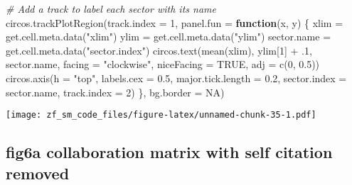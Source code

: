 \documentclass[
]{article}
\newenvironment{Shaded}{\begin{snugshade}}{\end{snugshade}}
\newcommand{\AttributeTok}[1]{\textcolor[rgb]{0.77,0.63,0.00}{#1}}
\newcommand{\CommentTok}[1]{\textcolor[rgb]{0.56,0.35,0.01}{\textit{#1}}}
\newcommand{\ConstantTok}[1]{\textcolor[rgb]{0.00,0.00,0.00}{#1}}
\newcommand{\ControlFlowTok}[1]{\textcolor[rgb]{0.13,0.29,0.53}{\textbf{#1}}}
\newcommand{\DecValTok}[1]{\textcolor[rgb]{0.00,0.00,0.81}{#1}}
\newcommand{\FloatTok}[1]{\textcolor[rgb]{0.00,0.00,0.81}{#1}}
\newcommand{\FunctionTok}[1]{\textcolor[rgb]{0.00,0.00,0.00}{#1}}
\newcommand{\NormalTok}[1]{#1}
\newcommand{\OtherTok}[1]{\textcolor[rgb]{0.56,0.35,0.01}{#1}}
\newcommand{\SpecialCharTok}[1]{\textcolor[rgb]{0.00,0.00,0.00}{#1}}
\newcommand{\StringTok}[1]{\textcolor[rgb]{0.31,0.60,0.02}{#1}}
\begin{document}
\begin{Shaded}
\begin{Highlighting}[]
\CommentTok{\# Add a track to label each sector with its name}
\FunctionTok{circos.trackPlotRegion}\NormalTok{(}\AttributeTok{track.index =} \DecValTok{1}\NormalTok{, }\AttributeTok{panel.fun =} \ControlFlowTok{function}\NormalTok{(x, y) \{}
\NormalTok{  xlim }\OtherTok{=} \FunctionTok{get.cell.meta.data}\NormalTok{(}\StringTok{"xlim"}\NormalTok{)}
\NormalTok{  ylim }\OtherTok{=} \FunctionTok{get.cell.meta.data}\NormalTok{(}\StringTok{"ylim"}\NormalTok{)}
\NormalTok{  sector.name }\OtherTok{=} \FunctionTok{get.cell.meta.data}\NormalTok{(}\StringTok{"sector.index"}\NormalTok{)}
  \FunctionTok{circos.text}\NormalTok{(}\FunctionTok{mean}\NormalTok{(xlim), ylim[}\DecValTok{1}\NormalTok{] }\SpecialCharTok{+}\NormalTok{ .}\DecValTok{1}\NormalTok{, sector.name, }\AttributeTok{facing =} \StringTok{"clockwise"}\NormalTok{, }\AttributeTok{niceFacing =} \ConstantTok{TRUE}\NormalTok{, }\AttributeTok{adj =} \FunctionTok{c}\NormalTok{(}\DecValTok{0}\NormalTok{, }\FloatTok{0.5}\NormalTok{))}
  \FunctionTok{circos.axis}\NormalTok{(}\AttributeTok{h =} \StringTok{"top"}\NormalTok{, }\AttributeTok{labels.cex =} \FloatTok{0.5}\NormalTok{, }\AttributeTok{major.tick.length =} \FloatTok{0.2}\NormalTok{, }\AttributeTok{sector.index =}\NormalTok{ sector.name, }\AttributeTok{track.index =} \DecValTok{2}\NormalTok{)}
\NormalTok{\}, }\AttributeTok{bg.border =} \ConstantTok{NA}\NormalTok{)}
\end{Highlighting}
\end{Shaded}

\texttt{[image: zf\_sm\_code\_files/figure-latex/unnamed-chunk-35-1.pdf]}

\hypertarget{fig6a-collaboration-matrix-with-self-citation-removed}{%
\subsection{fig6a collaboration matrix with self citation
removed}\label{fig6a-collaboration-matrix-with-self-citation-removed}}
\end{document}
